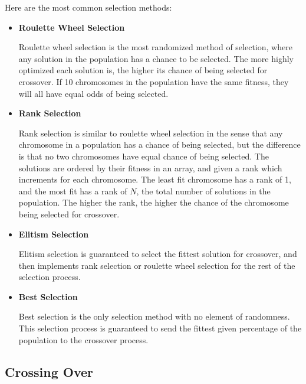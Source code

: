 \documentclass[a4paper]{article}
\begin{document}
Here are the most common selection methods:
\begin{itemize}
    \item \textbf{Roulette Wheel Selection}
    \begin{itemize}
        Roulette wheel selection is the most randomized method of selection, where any solution in the population has a chance to be selected. The more highly optimized each solution is, the higher its chance of being selected for crossover. If 10 chromosomes in the population have the same fitness, they will all have equal odds of being selected. \cite{gastudyapp}
    \end{itemize}
    \item \textbf{Rank Selection}
    \begin{itemize}
        Rank selection is similar to roulette wheel selection in the sense that any chromosome in a population has a chance of being selected, but the difference is that no two chromosomes have equal chance of being selected. The solutions are ordered by their fitness in an array, and given a rank which increments for each chromosome. The least fit chromosome has a rank of 1, and the most fit has a rank of $N$, the total number of solutions in the population. The higher the rank, the higher the chance of the chromosome being selected for crossover. \cite{gastudyapp}
    \end{itemize}
    \item \textbf{Elitism Selection}
    \begin{itemize}
        Elitism selection is guaranteed to select the fittest solution for crossover, and then implements rank selection or roulette wheel selection for the rest of the selection process. \cite{gastudyapp}
    \end{itemize}
    \item \textbf{Best Selection}
    \begin{itemize}
        Best selection is the only selection method with no element of randomness. This selection process is guaranteed to send the fittest given percentage of the population to the crossover process.
    \end{itemize}
\end{itemize}

\subsection{Crossing Over}
\end{document}
